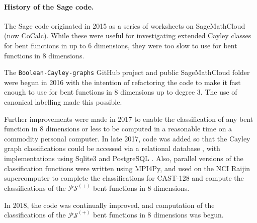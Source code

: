 \paragraph*{History of the Sage code.}

The Sage code originated in 2015 as a series of worksheets on Sage\-Math\-Cloud (now CoCalc).
While these were useful for investigating extended Cayley classes for bent functions in up to 6 dimensions,
they were too slow to use for bent functions in 8 dimensions.

The \texttt{Boolean-Cayley-graphs} GitHub project \cite{Leo16GitHub} and public Sage\-Math\-Cloud folder \cite{Leo17CoCalc} were begun in 2016
with the intention of refactoring the code to make it fast enough to use for bent functions in 8 dimensions
up to degree 3.
The use of canonical labelling made this possible.

Further improvements were made in 2017 to enable the classification of any bent function in 8 dimensions or less
to be computed in a reasonable time on a commodity personal computer.
In late 2017, code was added so that the Cayley graph classifications could be accessed via a relational database \cite{Leo18Database},
with implementations using Sqlite3 \cite{SQLite} and PostgreSQL \cite{PostgreSQL}.
Also, parallel versions of the classification functions were written using MPI4Py,
and used on the NCI Raijin supercomputer to complete the classifications for CAST-128 and compute
the classifications of the $\mathcal{PS}^{(+)}$ bent functions in 8 dimensions.

In 2018, the code was continually improved, and computation of the
classifications of the $\mathcal{PS}^{(+)}$ bent functions in 8 dimensions was begun.

